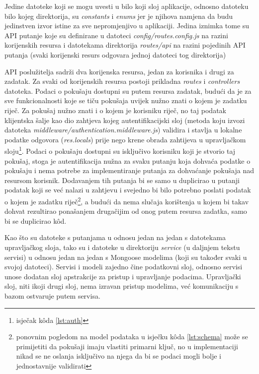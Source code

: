 \documentclass[times, utf8, diplomski, numeric]{fer}
\begin{document}
Jedine datoteke koji se mogu uvesti u bilo koji sloj aplikacije, odnosno datoteku bilo kojeg direktorija, su \emph{constants} i \emph{enums} jer je njihova namjena da budu jedinstven izvor istine  za sve nepromjenjivo u aplikaciji.
Jedina iznimka tome su API putanje koje su definirane u datoteci \emph{config/routes.config.js} na razini korijenskih resursa i datotekama direktorija \emph{routes/api} na razini pojedinih API putanja (svaki korijenski resurs odgovara jednoj datoteci tog direktorija)

API poslužitelja sadrži dva korijenska resursa, jedan za korisnika i drugi za zadatak.
Za svaki od korijenskih resursa postoji prikladna \emph{routes} i \emph{controllers} datoteka.
Podaci o pokušaju dostupni su putem resursa zadatak, budući da je za sve funkcionalnosti koje se tiču pokušaja uvijek nužno znati o kojem je zadatku riječ.
Za pokušaj nužno znati i o kojem je korisniku riječ, no taj podatak klijentska šalje kao dio zahtjeva kojeg  autentifikacijski sloj (metoda koju izvozi datoteka \emph{middleware/authentication.middleware.js}) validira i stavlja u lokalne podatke odgovora (\emph{res.locals}) prije nego krene obrada zahtijeva u upravljačkom sloju\footnote{isječak kôda \ref{lst:auth}}.
Podaci o pokušaju dostupni su isključivo korisniku koji je stvorio taj pokušaj, stoga je autentifikacija nužna za svaku putanju koja dohvaća podatke o pokušaju i nema potrebe za implementiranje putanja za dohvaćanje pokušaja nad resursom  korisnik. Dodavanjem tih putanja bi se samo u duplicirao u putanji podatak koji se već nalazi u zahtjevu i svejedno bi bilo potrebno poslati podatak o kojem je zadatku riječ\footnote{
    ponovnim pogledom na model podataka u isječku kôda \ref{lst:schema} može se primijetiti da pokušaji imaju vlastiti primarni ključ, no u implementaciji nikad se ne oslanja isključivo na njega da bi se podaci mogli bolje i jednostavnije validirati
}, a budući da nema slučaja korištenja u kojem bi takav dohvat rezultirao ponašanjem drugačijim od onog putem resursa zadatka, samo bi se duplicirao kôd.

Kao što su datoteke s putanjama u odnosu jedan na jedan s datotekama upravljačkog sloja, tako su i datoteke u direktoriju \emph{service} (u daljnjem tekstu servisi) u odnosu jedan na jedan s Mongoose modelima (koji su također svaki u svojoj datoteci).
Servisi i modeli zajedno čine podatkovni sloj, odnosno servisi unose dodatan sloj apstrakcije za pristup i upravljanje podacima.
Upravljački sloj, niti ikoji drugi sloj, nema izravan pristup modelima, već komunikaciju s bazom ostvaruje putem servisa.
\end{document}
